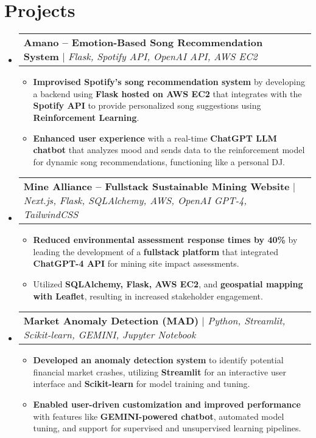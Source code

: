 \documentclass[letterpaper,10pt]{article}
\makeatletter
\newcommand{\resumeItem}[1]{
  \item\small{
    {#1 \vspace{-2pt}}
  }
}
\newcommand{\resumeProjectHeading}[2]{
    \item
    \begin{tabular*}{0.97\textwidth}{l@{\extracolsep{\fill}}r}
      \small#1 & #2 \\
    \end{tabular*}\vspace{-2pt}
}
\newcommand{\resumeSubHeadingListStart}{\begin{itemize}[leftmargin=0.15in, label={}]}
\newcommand{\resumeSubHeadingListEnd}{\end{itemize}}
\newcommand{\resumeItemListStart}{\begin{itemize}}
\newcommand{\resumeItemListEnd}{\end{itemize}\vspace{-5pt}}
\makeatother
\begin{document}
\section{Projects}
    \vspace{-4pt}
    \resumeSubHeadingListStart
      \resumeProjectHeading
          {\textbf{Amano – Emotion-Based Song Recommendation System} $|$ \emph{Flask, Spotify API, OpenAI API, AWS EC2}}{}
      \vspace{-4pt} %
          \resumeItemListStart
            \resumeItem{\textbf{Improvised Spotify's song recommendation system} by developing a backend using \textbf{Flask hosted on AWS EC2} that integrates with the \textbf{Spotify API} to provide personalized song suggestions using \textbf{Reinforcement Learning}.}
            \resumeItem{\textbf{Enhanced user experience} with a real-time \textbf{ChatGPT LLM chatbot} that analyzes mood and sends data to the reinforcement model for dynamic song recommendations, functioning like a personal DJ.}
          \resumeItemListEnd

      \resumeProjectHeading
          {\textbf{Mine Alliance – Fullstack Sustainable Mining Website} $|$ \emph{Next.js, Flask, SQLAlchemy, AWS, OpenAI GPT-4, TailwindCSS}}{}
      \vspace{-4pt}
          \resumeItemListStart
            \resumeItem{\textbf{Reduced environmental assessment response times by 40\%} by leading the development of a \textbf{fullstack platform} that integrated \textbf{ChatGPT-4 API} for mining site impact assessments.}
            \resumeItem{Utilized \textbf{SQLAlchemy, Flask, AWS EC2}, and \textbf{geospatial mapping with Leaflet}, resulting in increased stakeholder engagement.}
          \resumeItemListEnd

      \resumeProjectHeading
          {\textbf{Market Anomaly Detection (MAD)} $|$ \emph{Python, Streamlit, Scikit-learn, GEMINI, Jupyter Notebook}}{}
      \vspace{-4pt}
          \resumeItemListStart
            \resumeItem{\textbf{Developed an anomaly detection system} to identify potential financial market crashes, utilizing \textbf{Streamlit} for an interactive user interface and \textbf{Scikit-learn} for model training and tuning.}
            \resumeItem{\textbf{Enabled user-driven customization and improved performance} with features like \textbf{GEMINI-powered chatbot}, automated model tuning, and support for supervised and unsupervised learning pipelines.}
          \resumeItemListEnd
    \resumeSubHeadingListEnd
\end{document}
